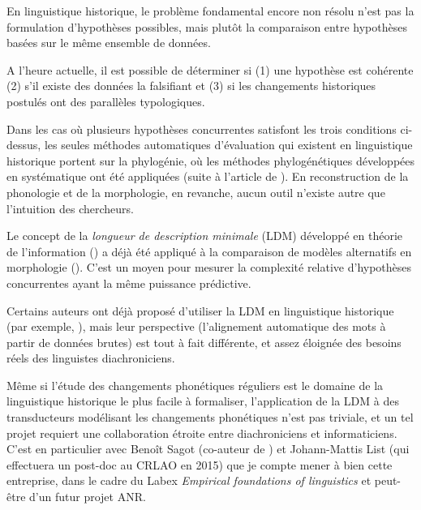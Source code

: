 \documentclass[oldfontcommands,oneside,a4paper,11pt]{article}
\begin{document}
En linguistique historique, le problème fondamental encore non résolu n'est pas la formulation d'hypothèses possibles, mais plutôt la comparaison entre hypothèses basées sur le même ensemble de données. 

A l'heure actuelle, il est possible de déterminer si (1) une hypothèse est cohérente (2) s'il existe des données la falsifiant et (3) si les changements historiques postulés ont des parallèles typologiques. 

Dans les cas où plusieurs hypothèses concurrentes satisfont les trois conditions ci-dessus, les seules méthodes automatiques d'évaluation qui existent en linguistique historique portent sur la phylogénie, où les méthodes phylogénétiques développées en systématique ont été appliquées (suite à l'article de \citealt{gray03ie}). En reconstruction de la phonologie et de la morphologie, en revanche, aucun outil n'existe autre que l'intuition des chercheurs. 

Le concept de la \textit{longueur de description minimale} (LDM) développé en théorie de l'information (\citealt{rissanen84}) a déjà été appliqué à la comparaison de modèles alternatifs en morphologie (\citealt{walther14compactness}). C'est un moyen pour mesurer la complexité relative d'hypothèses concurrentes ayant la même puissance prédictive. 

Certains auteurs ont déjà proposé d'utiliser la  LDM en linguistique historique (par exemple, \citealt{hiltunen12mdl}), mais leur perspective (l'alignement automatique des mots à partir de données brutes) est tout à fait différente, et assez éloignée des besoins réels des linguistes diachroniciens.

Même si l'étude des changements phonétiques réguliers est le domaine de la linguistique historique le plus facile à formaliser, l'application de la LDM à des transducteurs modélisant les changements phonétiques n'est pas triviale, et un tel projet requiert une collaboration étroite entre diachroniciens et informaticiens. C'est en particulier avec Benoît Sagot (co-auteur de \citealt{walther14compactness}) et Johann-Mattis List (qui effectuera un post-doc au CRLAO en 2015) que je compte mener à bien cette entreprise, dans le cadre du Labex \textit{Empirical foundations of linguistics} et peut-être d'un futur projet ANR.
\end{document}
